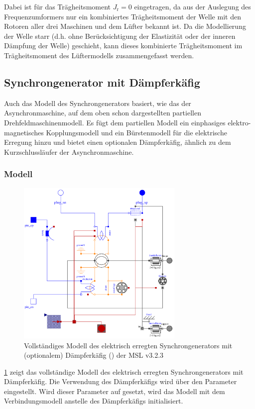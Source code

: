 Dabei ist für das Trägheitsmoment \(J_{\mathrm{r}}=0\) eingetragen, da aus der Auslegung des Frequenzumformers nur ein kombiniertes Trägheitsmoment der Welle mit den Rotoren aller drei Maschinen und dem Lüfter bekannt ist. Da die Modellierung der Welle starr (d.h. ohne Berücksichtigung der Elastizität oder der inneren Dämpfung der Welle) geschieht, kann dieses kombinierte Trägheitsmoment im Trägheitsmoment des Lüftermodells zusammengefasst werden.

\subsection{Synchrongenerator mit Dämpferkäfig}\label{sec:synchrongenerator}

Auch das Modell des Synchrongenerators basiert, wie das der Asynchronmaschine, auf dem oben schon dargestellten partiellen Drehfeldmaschinenmodell. Es fügt dem partiellen Modell ein einphasiges elektro-magnetisches Kopplungsmodell und ein Bürstenmodell für die elektrische Erregung hinzu und bietet einen optionalen Dämpferkäfig, ähnlich zu dem Kurzschlussläufer der Asynchronmaschine.

\hypertarget{sec:Modell-SG}{%
\subsubsection{Modell}\label{sec:Modell-SG}}
\begin{figure}
    \centering
    \includegraphics[height=8cm]{Bilder/SM_ElectricalExcited.pdf}
    \caption{Vollständiges Modell des elektrisch erregten Synchrongenerators mit (optionalem) Dämpferkäfig () der MSL v3.2.3}
    \label{fig:Synchrongenerator}
\end{figure}
\cref{fig:Synchrongenerator} zeigt das vollständige Modell des elektrisch erregten Synchrongenerators mit Dämpferkäfig. Die Verwendung des Dämpferkäfigs wird über den Parameter  eingestellt. Wird dieser Parameter auf  gesetzt, wird das Modell mit dem Verbindungsmodell  anstelle des Dämpferkäfigs initialisiert. 


